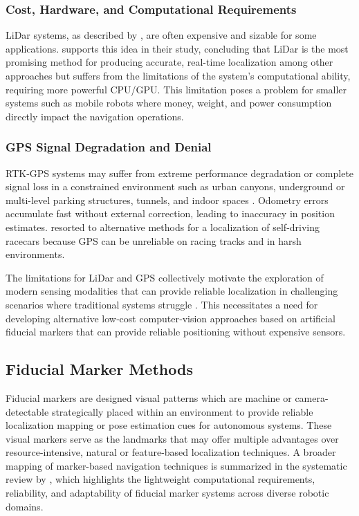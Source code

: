 \subsubsection{Cost, Hardware, and Computational Requirements}
LiDar systems, as described by \cite{Whitaker2020GlobalLocalizationFiducialsIMU}, are often expensive and sizable for some applications. \cite{Lu2021LocalizationTechniquesReview} supports this idea in their study, concluding that LiDar is the most promising method for producing accurate, real-time localization among other approaches but suffers from the limitations of the system's computational ability, requiring more powerful CPU/GPU. This limitation poses a problem for smaller systems such as mobile robots where money, weight, and power consumption directly impact the navigation operations.

\subsubsection{GPS Signal Degradation and Denial}
RTK-GPS systems may suffer from extreme performance degradation or complete signal loss in a constrained environment such as urban canyons, underground or multi-level parking structures, tunnels, and indoor spaces \citep{Bhat2024MultiSourceGPSDenied, Fang2020MarkerValetParking, Jeon2021LaneAidedDeadReckoning}. Odometry errors accumulate fast without external correction, leading to inaccuracy in position estimates. \cite{Massa2020LidarGNSSDeniedRacing} resorted to alternative methods for a localization of self-driving racecars because GPS can be unreliable on racing tracks and in harsh environments. 

The limitations for LiDar and GPS collectively motivate the exploration of modern sensing modalities that can provide reliable localization in challenging scenarios where traditional systems struggle  \citep{Dreissig2023LiDARAdverseWeatherSurvey, Zhang2023AdverseWeatherPerceptionSurvey}. This  necessitates a need for developing alternative low‑cost computer‑vision approaches based on artificial fiducial markers that can provide reliable positioning without expensive sensors.

\subsection{Fiducial Marker Methods}
Fiducial markers are designed visual patterns which are machine or camera-detectable strategically placed within an environment to provide reliable localization mapping or pose estimation cues for autonomous systems. These visual markers serve as the landmarks that may offer multiple advantages over resource-intensive, natural or feature-based localization techniques. A broader mapping of marker-based navigation techniques is summarized in the systematic review by \cite{Alghamdi2025MobileRobotMarkersMapping}, which highlights the lightweight computational requirements, reliability, and adaptability of fiducial marker systems across diverse robotic domains.

